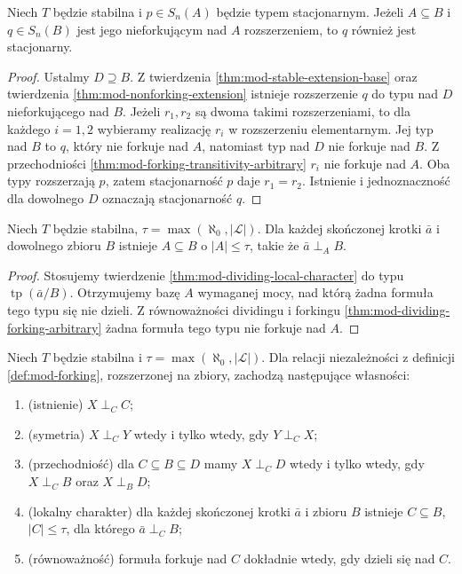\begin{wniosek}
\label{cor:mod-stationary-extension}
Niech $T$ będzie stabilna i $p\in S_n(A)$
będzie typem stacjonarnym. Jeżeli
$A\subseteq B$ i $q\in S_n(B)$ jest jego
nieforkującym nad $A$ rozszerzeniem,
to $q$ również jest stacjonarny.
\end{wniosek}
\begin{proof}
Ustalmy $D\supseteq B$. Z twierdzenia
\ref{thm:mod-stable-extension-base} oraz
twierdzenia \ref{thm:mod-nonforking-extension}
istnieje rozszerzenie $q$ do typu nad $D$
nieforkującego nad $B$.
Jeżeli $r_1,r_2$ są dwoma takimi rozszerzeniami,
to dla każdego $i=1,2$ wybieramy realizację
$r_i$ w rozszerzeniu elementarnym.
Jej typ nad $B$ to $q$, który nie forkuje
nad $A$, natomiast typ nad $D$ nie forkuje
nad $B$. Z przechodniości
\ref{thm:mod-forking-transitivity-arbitrary}
$r_i$ nie forkuje nad $A$.
Oba typy rozszerzają $p$, zatem stacjonarność
$p$ daje $r_1=r_2$.
Istnienie i jednoznaczność dla dowolnego $D$
oznaczają stacjonarność $q$.
\end{proof}

\begin{wniosek}
\label{cor:mod-forking-local-arbitrary}
Niech $T$ będzie stabilna,
$\tau=\max(\aleph_0,|\mathcal L|)$.
Dla każdej skończonej krotki $\bar a$
i dowolnego zbioru $B$ istnieje
$A\subseteq B$ o $|A|\leq\tau$,
takie że $\bar a\mathrel{\perp_A}B$.
\end{wniosek}
\begin{proof}
Stosujemy twierdzenie
\ref{thm:mod-dividing-local-character}
do typu $\operatorname{tp}(\bar a/B)$.
Otrzymujemy bazę $A$ wymaganej mocy,
nad którą żadna formuła tego typu
się nie dzieli.
Z równoważności dividingu i forkingu
\ref{thm:mod-dividing-forking-arbitrary}
żadna formuła tego typu nie forkuje nad $A$.
\end{proof}

\begin{twierdzenie}
\label{thm:mod-stable-forking-calculus}
Niech $T$ będzie stabilna i
$\tau=\max(\aleph_0,|\mathcal L|)$.
Dla relacji niezależności z definicji
\ref{def:mod-forking}, rozszerzonej na zbiory,
zachodzą następujące własności:
\begin{enumerate}[label=(\roman*)]
\item (istnienie) $X\mathrel{\perp_C}C$;
\item (symetria) $X\mathrel{\perp_C}Y$ wtedy
i tylko wtedy, gdy $Y\mathrel{\perp_C}X$;
\item (przechodniość) dla $C\subseteq B\subseteq D$
mamy $X\mathrel{\perp_C}D$ wtedy i tylko wtedy,
gdy $X\mathrel{\perp_C}B$ oraz
$X\mathrel{\perp_B}D$;
\item (lokalny charakter) dla każdej skończonej
krotki $\bar a$ i zbioru $B$ istnieje
$C\subseteq B$, $|C|\leq\tau$, dla którego
$\bar a\mathrel{\perp_C}B$;
\item (równoważność) formuła forkuje nad $C$
dokładnie wtedy, gdy dzieli się nad $C$.
\end{enumerate}
\end{twierdzenie}

